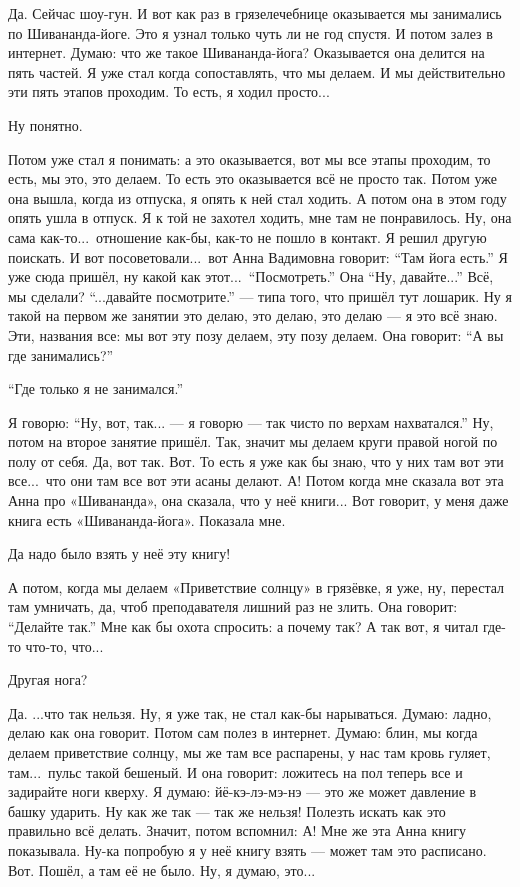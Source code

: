 \I
Да. Сейчас шоу-гун.
И вот как раз в грязелечебнице оказывается мы занимались по Шивананда-йоге.
Это я узнал только чуть ли не год спустя. И потом залез в интернет.
Думаю: что же такое Шивананда-йога?
Оказывается она делится на пять частей.
Я уже стал когда сопоставлять, что мы делаем.
И мы действительно эти пять этапов проходим.
То есть, я ходил просто...

\M
Ну понятно.

\I
Потом уже стал я понимать: а это оказывается, вот мы все этапы проходим, то есть, мы это, это делаем.
То есть это оказывается всё не просто так.
Потом уже она вышла, когда из отпуска, я опять к ней стал ходить.
А потом она в этом году опять ушла в отпуск.
Я к той не захотел ходить, мне там не понравилось.
Ну, она сама как-то...\ отношение как-бы,
как-то не пошло в контакт.
Я решил другую поискать. И вот посоветовали...\ вот Анна Вадимовна говорит: ``Там йога
есть.'' Я уже сюда пришёл, ну какой как этот...\ ``Посмотреть.'' Она ``Ну, давайте...''
Всё, мы сделали? ``...давайте посмотрите.'' --- типа того, что пришёл тут лошарик.
Ну я такой на первом же занятии это делаю, это делаю, это делаю --- я это всё знаю.
Эти, названия все: мы вот эту позу делаем, эту позу делаем. Она говорит:
``А вы где занимались?''

\M
``Где только я не занимался.''

\I
Я говорю: ``Ну, вот, так... --- я говорю --- так чисто по верхам
нахватался.'' Ну, потом на второе занятие пришёл.
Так, значит мы делаем круги
правой ногой по полу от себя. Да, вот так.
Вот. То есть я уже как бы знаю, что у них там вот эти все...\ что они там все вот эти асаны делают.
А! Потом когда мне сказала вот эта Анна про «Шивананда», она сказала,
что у неё книги...
Вот говорит, у меня даже книга есть «Шивананда-йога». Показала мне.

\M
Да надо было взять у неё эту книгу!

\I
А потом, когда мы делаем «Приветствие солнцу» в грязёвке, я уже, ну, перестал там умничать, да,
чтоб преподавателя лишний раз не злить.
Она говорит: ``Делайте так.''
Мне как бы охота спросить: а почему так?
А так вот, я читал где-то что-то, что...

\M
Другая нога?

\I
Да. ...что так нельзя. Ну, я уже так, не стал как-бы нарываться. Думаю: ладно,
делаю как она говорит. Потом сам полез в интернет. Думаю: блин, мы когда делаем приветствие
солнцу, мы же там все распарены, у нас там кровь гуляет, там...\
пульс такой бешеный. И она говорит: ложитесь на пол теперь все и задирайте ноги кверху.
Я думаю: йё-кэ-лэ-мэ-нэ --- это
же может давление в башку ударить. Ну как же так --- так же нельзя!
Полезть искать как это правильно всё делать. Значит, потом вспомнил:
А! Мне же эта Анна книгу показывала.
Ну-ка попробую я у неё
книгу взять --- может там это расписано.
Вот.
Пошёл, а там её не было. Ну, я думаю, это...


